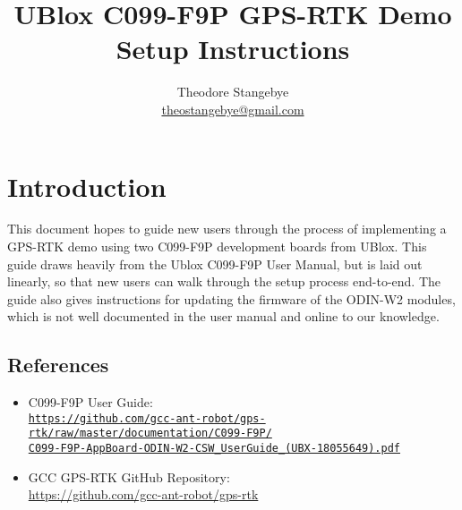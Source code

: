 \documentclass{article}%
\begin{document}
\title{UBlox C099-F9P GPS-RTK Demo Setup Instructions}
\author{Theodore Stangebye\\
\href{mailto:theostangebye@gmail.com}{theostangebye@gmail.com}  }
\maketitle






\vspace*{\fill}
\tableofcontents
\vspace*{\fill}

\newpage

\section{Introduction}
This document hopes to guide new users through the process of implementing a GPS-RTK demo using two C099-F9P development boards from UBlox. 
This guide draws heavily from the Ublox C099-F9P User Manual, but is laid out linearly, so that new users can walk through the setup process end-to-end.
The guide also gives instructions for updating the firmware of the ODIN-W2 modules, which is not well documented in the user manual and online to our knowledge.

\subsection{References}\label{ref:references}
	\begin{itemize}
		\item C099-F9P User Guide:\\ \href{https://github.com/gcc-ant-robot/gps-rtk/raw/master/documentation/C099-F9P/C099-F9P-AppBoard-ODIN-W2-CSW_UserGuide_(UBX-18055649).pdf}{\texttt{https://github.com/gcc-ant-robot/gps-rtk/raw/master/documentation/C099-F9P/\\C099-F9P-AppBoard-ODIN-W2-CSW\_UserGuide\_(UBX-18055649).pdf}}
		\item GCC GPS-RTK GitHub Repository: \\
		\url{https://github.com/gcc-ant-robot/gps-rtk}
	\end{itemize}
\end{document}
